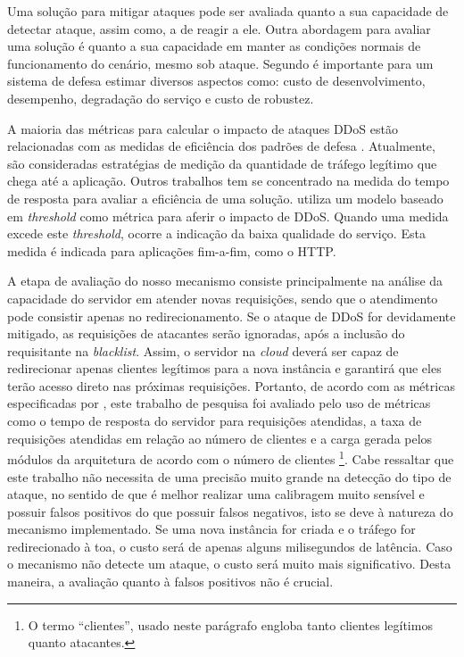 

Uma solução para mitigar ataques pode ser avaliada quanto a sua capacidade de detectar ataque, assim como, a de reagir a ele. Outra abordagem para avaliar uma solução é quanto a sua capacidade em manter as condições normais de funcionamento do cenário, mesmo sob ataque. Segundo \cite{4600003} é importante para um sistema de defesa estimar diversos aspectos como: custo de desenvolvimento, desempenho, degradação do serviço e custo de robustez. 

A maioria das métricas para calcular o impacto de ataques DDoS estão relacionadas com as medidas de eficiência dos padrões de defesa \cite{4809152}. Atualmente, são consideradas estratégias de medição da quantidade de tráfego legítimo que chega até a aplicação. Outros trabalhos tem se concentrado na medida do tempo de resposta para avaliar a eficiência de uma solução. \cite{Mirkovic:2007:TUM:1281700.1281708} utiliza um modelo baseado em \emph{threshold} como métrica para aferir o impacto de DDoS. Quando uma medida excede este \emph{threshold}, ocorre a  indicação da baixa qualidade do serviço. Esta medida é indicada para aplicações fim-a-fim, como o HTTP.

A etapa de avaliação do nosso mecanismo consiste principalmente na análise
da capacidade do servidor em atender novas requisições, sendo que o atendimento pode consistir apenas no redirecionamento. 
Se o ataque de DDoS for devidamente
mitigado, as requisições de atacantes serão ignoradas, após a inclusão do requisitante na \emph{blacklist}. Assim, o servidor na \emph{cloud} deverá ser capaz de redirecionar apenas clientes legítimos 
para a nova instância e garantirá que eles terão acesso direto nas próximas requisições. 
%
Portanto, de acordo com as métricas especificadas por \cite{4600003}, este trabalho de pesquisa foi avaliado pelo uso de métricas como o tempo de resposta do servidor para requisições atendidas, a taxa de requisições atendidas em relação ao número de clientes e a carga gerada pelos módulos da arquitetura de acordo com o número de clientes \footnote{O termo ``clientes'', usado neste parágrafo engloba tanto clientes legítimos quanto atacantes.}. 
%
Cabe ressaltar que este trabalho não necessita de uma precisão muito grande na detecção do tipo de ataque, no sentido de que é melhor realizar uma calibragem muito sensível e possuir falsos positivos do que possuir falsos negativos, isto se deve à natureza do mecanismo implementado. Se uma nova instância for criada e o tráfego for redirecionado à toa, o custo será de apenas alguns milisegundos de latência. Caso o mecanismo não detecte um ataque, o custo será muito mais significativo. Desta maneira, a avaliação quanto à falsos positivos não é crucial. %



